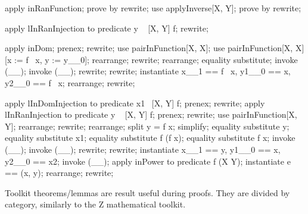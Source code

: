 \begin{LPScript}\begin{forget}[lApplyInverse2]
apply inRanFunction;
prove by rewrite;
use applyInverse[X, Y];
prove by rewrite;
\end{forget}\end{LPScript}

\begin{LPScript}\begin{forget}[lPInjInvPointIsPInjElem]
apply lInRanInjection to predicate y \in  \ran~ [X, Y] f;
rewrite;
\end{forget}\end{LPScript}

\begin{LPScript}\begin{forget}[lFollowingApplicationNoLoopHomogeneousPInj]
apply inDom;
prenex;
rewrite;
use pairInFunction[X, X];
use pairInFunction[X, X][x := f~ x, y := y\_\_0];
rearrange;
rewrite;
rearrange;
equality substitute;
invoke (\_\pinj \_);
invoke (\_\pfun \_);
rewrite;
rewrite;
instantiate x\_\_1 == f~ x, y1\_\_0 == x, y2\_\_0 == f~ x;
rearrange;
rewrite;
\end{forget}\end{LPScript}

\begin{LPScript}\begin{forget}[lPInjPointIsNotShared]
apply lInDomInjection to predicate x1 \in  \dom~[X, Y] f;
prenex;
rewrite;
apply lInRanInjection to predicate y \in  \ran~ [X, Y] f;
prenex;
rewrite;
use pairInFunction[X, Y];
rearrange;
rewrite;
rearrange;
split y = f x;
simplify;
equality substitute y;
equality substitute x1;
equality substitute f \inv [X, Y] (f x);
equality substitute f x;
invoke (\_\pinj \_);
invoke (\_\pfun \_);
rewrite;
rewrite;
instantiate x\_\_1 == y, y1\_\_0 == x, y2\_\_0 == x2;
invoke (\_\rel \_);
apply inPower to predicate f \in  \power  (X \cross  Y);
instantiate e == (x, y);
rearrange;
rewrite;
\end{forget}\end{LPScript}

Toolkit theorems/lemmas are result useful during proofs.
They are divided by category, similarly to the Z mathematical toolkit.
%

